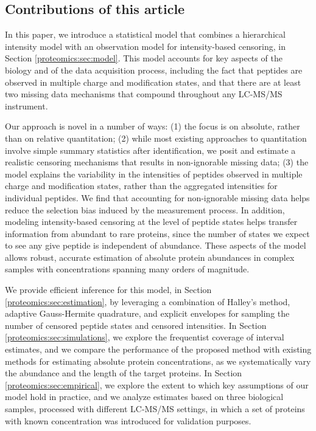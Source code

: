 \subsection{Contributions of this article}

In this paper, we introduce a statistical model that combines a hierarchical intensity model with an observation model for intensity-based censoring, in Section \ref{proteomics:sec:model}.
This model accounts for key aspects of the biology and of the data acquisition process, including the fact that peptides are observed in multiple charge and modification states, and that there are at least two missing data mechanisms that compound throughout any LC-MS/MS instrument.

Our approach is novel in a number of ways: 
 (1) the focus is on absolute, rather than on relative quantitation;
 (2) while most existing approaches to quantitation involve simple summary statistics after identification, we posit and estimate a realistic censoring mechanisms that results in non-ignorable missing data;
 (3) the model explains the variability in the  intensities of peptides observed in multiple charge and modification states, rather than the aggregated intensities for individual peptides.  
%
We find that accounting for non-ignorable missing data helps reduce the selection bias induced by the measurement process.
In addition, modeling intensity-based censoring at the level of peptide states helps transfer information from abundant to rare proteins, since the number of states we expect to see any give peptide is independent of abundance.
These aspects of the model allows robust, accurate estimation of absolute protein abundances in complex samples with concentrations spanning many orders of magnitude.

We provide efficient inference for this model, in Section \ref{proteomics:sec:estimation}, by leveraging a combination of Halley's method, adaptive Gauss-Hermite quadrature, and explicit envelopes for sampling the number of censored peptide states and censored intensities.
In Section \ref{proteomics:sec:simulations}, we explore the frequentist coverage of interval estimates, and we compare the performance of the proposed method with existing methods for estimating absolute protein concentrations, as we systematically vary the abundance and the length of the target proteins.
In Section \ref{proteomics:sec:empirical}, we explore the extent to which key assumptions of our model hold in practice, and we analyze estimates based on three biological samples, processed with different LC-MS/MS settings, in which a set of proteins with known concentration was introduced for validation purposes.



